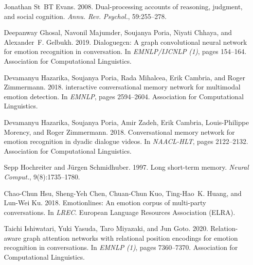 \documentclass[11pt,a4paper]{article}
\begin{document}
\begin{thebibliography}{45}
  Jonathan St~BT Evans. 2008.
  \newblock Dual-processing accounts of reasoning, judgment, and social
    cognition.
  \newblock \emph{Annu. Rev. Psychol.}, 59:255--278.
  
  Deepanway Ghosal, Navonil Majumder, Soujanya Poria, Niyati Chhaya, and
    Alexander~F. Gelbukh. 2019.
  \newblock Dialoguegcn: {A} graph convolutional neural network for emotion
    recognition in conversation.
  \newblock In \emph{{EMNLP/IJCNLP} {(1)}}, pages 154--164. Association for
    Computational Linguistics.
  
  Devamanyu Hazarika, Soujanya Poria, Rada Mihalcea, Erik Cambria, and Roger
    Zimmermann. 2018{}.
   interactive conversational memory network for multimodal
    emotion detection.
  \newblock In \emph{{EMNLP}}, pages 2594--2604. Association for Computational
    Linguistics.
  
  Devamanyu Hazarika, Soujanya Poria, Amir Zadeh, Erik Cambria, Louis{-}Philippe
    Morency, and Roger Zimmermann. 2018{}.
  \newblock Conversational memory network for emotion recognition in dyadic
    dialogue videos.
  \newblock In \emph{{NAACL-HLT}}, pages 2122--2132. Association for
    Computational Linguistics.
  
  Sepp Hochreiter and J{\"{u}}rgen Schmidhuber. 1997.
  \newblock Long short-term memory.
  \newblock \emph{Neural Comput.}, 9(8):1735--1780.
  
  Chao{-}Chun Hsu, Sheng{-}Yeh Chen, Chuan{-}Chun Kuo, Ting{-}Hao~K. Huang, and
    Lun{-}Wei Ku. 2018.
  \newblock Emotionlines: An emotion corpus of multi-party conversations.
  \newblock In \emph{{LREC}}. European Language Resources Association {(ELRA)}.
  
  Taichi Ishiwatari, Yuki Yasuda, Taro Miyazaki, and Jun Goto. 2020.
  \newblock Relation-aware graph attention networks with relational position
    encodings for emotion recognition in conversations.
  \newblock In \emph{{EMNLP} {(1)}}, pages 7360--7370. Association for
    Computational Linguistics.
  

\end{thebibliography}
\end{document}
